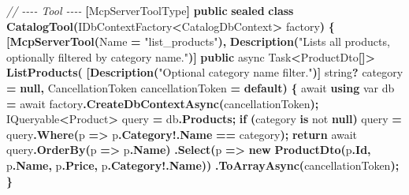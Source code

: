 \documentclass[
  italian,
  10pt,
]{book}
\newenvironment{Shaded}{\begin{snugshade}}{\end{snugshade}}
\newcommand{\CommentTok}[1]{\textcolor[rgb]{0.56,0.35,0.01}{\textit{#1}}}
\newcommand{\DataTypeTok}[1]{\textcolor[rgb]{0.13,0.29,0.53}{#1}}
\newcommand{\FunctionTok}[1]{\textcolor[rgb]{0.13,0.29,0.53}{\textbf{#1}}}
\newcommand{\KeywordTok}[1]{\textcolor[rgb]{0.13,0.29,0.53}{\textbf{#1}}}
\newcommand{\NormalTok}[1]{#1}
\newcommand{\OperatorTok}[1]{\textcolor[rgb]{0.81,0.36,0.00}{\textbf{#1}}}
\newcommand{\StringTok}[1]{\textcolor[rgb]{0.31,0.60,0.02}{#1}}
\begin{document}
\begin{Shaded}
\begin{Highlighting}[]
\CommentTok{// {-}{-}{-}{-} Tool {-}{-}{-}{-}}
\OperatorTok{[}\NormalTok{McpServerToolType}\OperatorTok{]}
\KeywordTok{public} \KeywordTok{sealed} \KeywordTok{class} \FunctionTok{CatalogTool}\OperatorTok{(}\NormalTok{IDbContextFactory}\OperatorTok{\textless{}}\NormalTok{CatalogDbContext}\OperatorTok{\textgreater{}}\NormalTok{ factory}\OperatorTok{)}
\OperatorTok{\{}
    \OperatorTok{[}\FunctionTok{McpServerTool}\OperatorTok{(}\NormalTok{Name }\OperatorTok{=} \StringTok{"list\_products"}\OperatorTok{),} \FunctionTok{Description}\OperatorTok{(}\StringTok{"Lists all products, optionally filtered by category name."}\OperatorTok{)]}
    \KeywordTok{public}\NormalTok{ async Task}\OperatorTok{\textless{}}\NormalTok{ProductDto}\OperatorTok{[]\textgreater{}} \FunctionTok{ListProducts}\OperatorTok{(}
        \OperatorTok{[}\FunctionTok{Description}\OperatorTok{(}\StringTok{"Optional category name filter."}\OperatorTok{)]} \DataTypeTok{string}\OperatorTok{?}\NormalTok{ category }\OperatorTok{=} \KeywordTok{null}\OperatorTok{,}
\NormalTok{        CancellationToken cancellationToken }\OperatorTok{=} \KeywordTok{default}\OperatorTok{)}
    \OperatorTok{\{}
\NormalTok{        await }\KeywordTok{using} \DataTypeTok{var}\NormalTok{ db }\OperatorTok{=}\NormalTok{ await factory}\OperatorTok{.}\FunctionTok{CreateDbContextAsync}\OperatorTok{(}\NormalTok{cancellationToken}\OperatorTok{);}
\NormalTok{        IQueryable}\OperatorTok{\textless{}}\NormalTok{Product}\OperatorTok{\textgreater{}}\NormalTok{ query }\OperatorTok{=}\NormalTok{ db}\OperatorTok{.}\FunctionTok{Products}\OperatorTok{;}
        \KeywordTok{if} \OperatorTok{(}\NormalTok{category }\KeywordTok{is}\NormalTok{ not }\KeywordTok{null}\OperatorTok{)}
\NormalTok{            query }\OperatorTok{=}\NormalTok{ query}\OperatorTok{.}\FunctionTok{Where}\OperatorTok{(}\NormalTok{p }\OperatorTok{=\textgreater{}}\NormalTok{ p}\OperatorTok{.}\FunctionTok{Category}\OperatorTok{!.}\FunctionTok{Name} \OperatorTok{==}\NormalTok{ category}\OperatorTok{);}
        \KeywordTok{return}\NormalTok{ await query}\OperatorTok{.}\FunctionTok{OrderBy}\OperatorTok{(}\NormalTok{p }\OperatorTok{=\textgreater{}}\NormalTok{ p}\OperatorTok{.}\FunctionTok{Name}\OperatorTok{)}
            \OperatorTok{.}\FunctionTok{Select}\OperatorTok{(}\NormalTok{p }\OperatorTok{=\textgreater{}} \KeywordTok{new} \FunctionTok{ProductDto}\OperatorTok{(}\NormalTok{p}\OperatorTok{.}\FunctionTok{Id}\OperatorTok{,}\NormalTok{ p}\OperatorTok{.}\FunctionTok{Name}\OperatorTok{,}\NormalTok{ p}\OperatorTok{.}\FunctionTok{Price}\OperatorTok{,}\NormalTok{ p}\OperatorTok{.}\FunctionTok{Category}\OperatorTok{!.}\FunctionTok{Name}\OperatorTok{))}
            \OperatorTok{.}\FunctionTok{ToArrayAsync}\OperatorTok{(}\NormalTok{cancellationToken}\OperatorTok{);}
    \OperatorTok{\}}


\end{Highlighting}
\end{Shaded}
\end{document}

